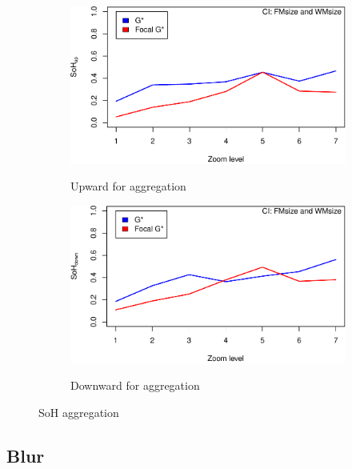 \documentclass{itatnew}
\begin{document}
\begin{figure}[htp]
  \begin{subfigure}{\linewidth}
    \caption{Upward for aggregation}
    \includegraphics[width=\linewidth]{images/gen-zoom-sohup-1}
    \label{fig:UpwardZoom}
  \end{subfigure}
  \hspace{1em}
  \begin{subfigure}{\linewidth}
    \caption{Downward for aggregation}
    \includegraphics[width=\linewidth]{images/gen-zoom-sohdown-1}
    \label{fig:DownwardZoom}
  \end{subfigure}
  \caption{SoH aggregation}
  \label{fig:Zoom}
\end{figure}


\subsection{Blur}
\end{document}
